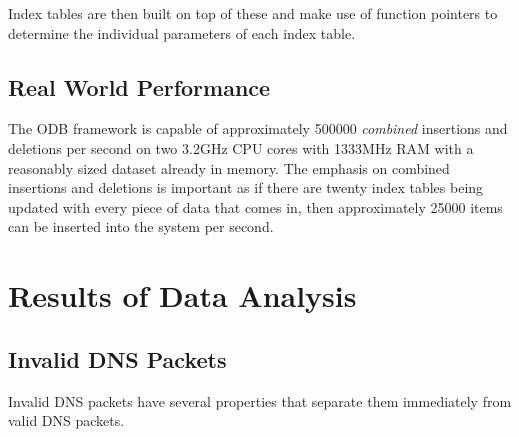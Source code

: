 \documentclass{article}
\theoremstyle{remark}
\theoremstyle{definition}
\theoremstyle{definition}
\theoremstyle{definition}
\begin{document}
Index tables are then built on top of these and make use of function pointers to determine the individual parameters of each index table.

\subsection{Real World Performance}
The ODB framework is capable of approximately 500000 \emph{combined} insertions and deletions per second on two 3.2GHz CPU cores with 1333MHz RAM with a reasonably sized dataset already in memory. The emphasis on combined insertions and deletions is important as if there are twenty index tables being updated with every piece of data that comes in, then approximately 25000 items can be inserted into the system per second.

\section{Results of Data Analysis}
\subsection{Invalid DNS Packets}
Invalid DNS packets have several properties that separate them immediately from valid DNS packets.
\end{document}
